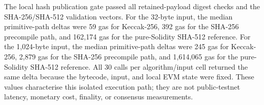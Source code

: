 The local hash publication gate passed all retained-payload digest checks and the SHA-256/SHA-512 validation vectors. For the 32-byte input, the median primitive-path deltas were 59 gas for Keccak-256, 392 gas for the SHA-256 precompile path, and 162,174 gas for the pure-Solidity SHA-512 reference. For the 1,024-byte input, the median primitive-path deltas were 245 gas for Keccak-256, 2,879 gas for the SHA-256 precompile path, and 1,614,065 gas for the pure-Solidity SHA-512 reference. All 30 calls per algorithm/input cell returned the same delta because the bytecode, input, and local EVM state were fixed. These values characterise this isolated execution path; they are not public-testnet latency, monetary cost, finality, or consensus measurements.
